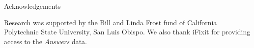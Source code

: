\documentclass[final]{beamer}
\newlength{\sepwid}
\newlength{\onecolwid}
\newlength{\twocolwid}
\begin{document}
\begin{frame}[t]
\begin{columns}[t]
\begin{column}{\twocolwid}
\begin{columns}[t,totalwidth=\twocolwid]
\begin{column}{\onecolwid}
\vspace{1ex}

\begin{block}{Acknowledgements}

\textcolor{dblue!70}{} Research was supported by the Bill and Linda Frost fund of California Polytechnic State University, San Luis Obispo. We also thank iFixit for providing access to the \textit{Answers} data.

\end{block}


\end{column} %

\end{columns} %

\end{column} %







% 
% 
% 
% 
\end{columns} %

\end{frame} %
\end{document}
